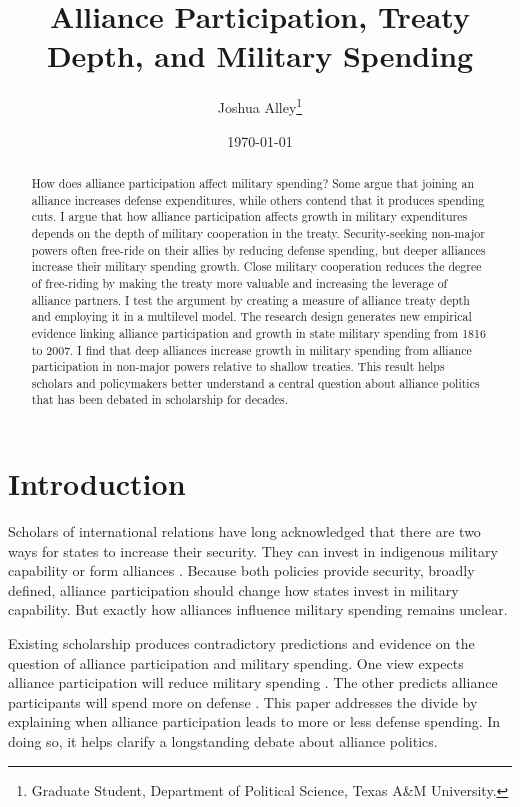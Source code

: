 \documentclass[12pt]{article}
\title{\textbf{Alliance Participation, Treaty Depth, and Military Spending}}
\author{Joshua Alley\footnote{Graduate Student,
Department of Political Science, Texas A\&M University.}}
\date{{\normalsize \today}}
\begin{document}
\maketitle 

\doublespace 

\begin{abstract}
How does alliance participation affect military spending? 
Some argue that joining an alliance increases defense expenditures, while others contend that it produces spending cuts.
I argue that how alliance participation affects growth in military expenditures depends on the depth of military cooperation in the treaty. 
Security-seeking non-major powers often free-ride on their allies by reducing defense spending, but deeper alliances increase their military spending growth.   
Close military cooperation reduces the degree of free-riding by making the treaty more valuable and increasing the leverage of alliance partners. 
I test the argument by creating a measure of alliance treaty depth and employing it in a multilevel model. 
The research design generates new empirical evidence linking alliance participation and growth in state military spending from 1816 to 2007. 
I find that deep alliances increase growth in military spending from alliance participation in non-major powers relative to shallow treaties.  
This result helps scholars and policymakers better understand a central question about alliance politics that has been debated in scholarship for decades. 
\end{abstract}


 \newpage 


\section{Introduction}


Scholars of international relations have long acknowledged that there are two ways for states to increase their security. 
They can invest in indigenous military capability or form alliances \citep{Morgenthau1948, Altfield1984, Morrow1993}.
Because both policies provide security, broadly defined, alliance participation should change how states invest in military capability. 
But exactly how alliances influence military spending remains unclear. 


Existing scholarship produces contradictory predictions and evidence on the question of alliance participation and military spending. 
One view expects alliance participation will reduce military spending \citep{Morrow1993, Conybeare1994, DigiuseppePoast2016}. 
The other predicts alliance participants will spend more on defense \citep{Diehl1994, MorganPalmer2006}.
This paper addresses the divide by explaining when alliance participation leads to more or less defense spending. 
In doing so, it helps clarify a longstanding debate about alliance politics.
\end{document}
